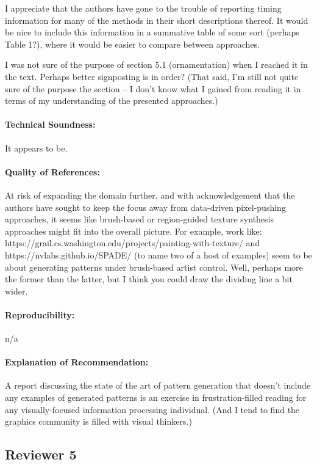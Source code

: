 \documentclass{egpubl}
\newcommand{\rev}[2]{{\color{greenrev}\textsuperscript{#1}#2}}
\renewcommand{\rev}[2]{{#2}}
\begin{document}
I appreciate that the authors have gone to the trouble of reporting timing information for many of the methods in their short descriptions thereof. It would be nice to include this information in a summative table of some sort (perhaps Table 1?), where it would be easier to compare between approaches.

I was not sure of the purpose of section 5.1 (ornamentation) when I reached it in the text. Perhaps better signposting is in order? (That said, I'm still not quite sure of the purpose the section -- I don't know what I gained from reading it in terms of my understanding of the presented approaches.)
\paragraph*{Technical Soundness:} It appears to be.
\paragraph*{Quality of References:} At risk of expanding the domain further, and with acknowledgement that the authors have sought to keep the focus away from data-driven pixel-pushing approaches,  it seems like brush-based or region-guided texture synthesis approaches might fit into the overall picture. For example, work like:
https://grail.cs.washington.edu/projects/painting-with-texture/
and https://nvlabs.github.io/SPADE/
(to name two of a host of examples)
seem to be about generating patterns under brush-based artist control. Well, perhaps more the former than the latter, but I think you could draw the dividing line a bit wider.


\paragraph*{Reproducibility:} n/a


\paragraph*{Explanation of Recommendation:} A report discussing the state of the art of pattern generation that doesn't include any examples of generated patterns is an exercise in frustration-filled reading for any visually-focused information processing individual. (And I tend to find the graphics community is filled with visual thinkers.)


\rev{Comments}{}


\subsection*{Reviewer 5} 
\end{document}
